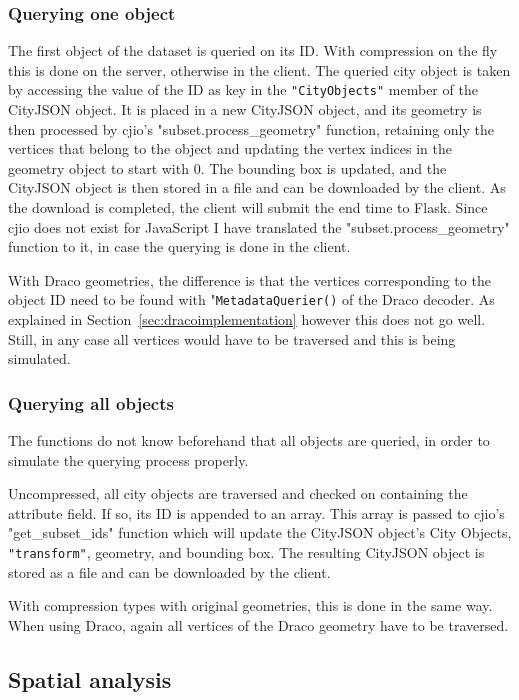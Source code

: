 \subsubsection{Querying one object}
\label{sec:queryone}
The first object of the dataset is queried on its ID.
With compression on the fly this is done on the server, otherwise in the client.
The queried city object is taken by accessing the value of the ID as key in the \texttt{"CityObjects"} member of the CityJSON object.
It is placed in a new CityJSON object, and its geometry is then processed by cjio's "subset.process\_geometry" function, retaining only the vertices that belong to the object and updating the vertex indices in the geometry object to start with 0.
The bounding box is updated, and the CityJSON object is then stored in a file and can be downloaded by the client.
As the download is completed, the client will submit the end time to Flask.
Since cjio does not exist for JavaScript I have translated the "subset.process\_geometry" function to it, in case the querying is done in the client.

With Draco geometries, the difference is that the vertices corresponding to the object ID need to be found with "\texttt{MetadataQuerier()} of the Draco decoder.
As explained in Section~\ref{sec:dracoimplementation} however this does not go well.
Still, in any case all vertices would have to be traversed and this is being simulated.


\subsubsection{Querying all objects}
The functions do not know beforehand that all objects are queried, in order to simulate the querying process properly.

Uncompressed, all city objects are traversed and checked on containing the attribute field.
If so, its ID is appended to an array.
This array is passed to cjio's "get\_subset\_ids" function which will update the CityJSON object's City Objects, \texttt{"transform"}, geometry, and bounding box.
The resulting CityJSON object is stored as a file and can be downloaded by the client.

With compression types with original geometries, this is done in the same way.
When using Draco, again all vertices of the Draco geometry have to be traversed.



\subsection{Spatial analysis}

